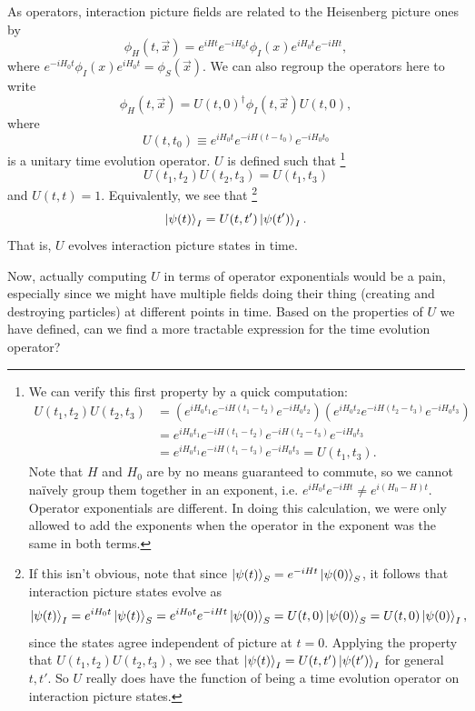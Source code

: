 As operators, interaction picture fields are related to the Heisenberg picture ones by
$$\phi_H(t,\vec x)=e^{iHt} e^{-iH_0t} \phi_I(x) e^{iH_0t} e^{-iHt},$$
where $e^{-iH_0t} \phi_I(x) e^{iH_0t}=\phi_S(\vec x).$ We can also regroup the operators here to write
$$\phi_H(t,\vec x) = U(t,0)^\dagger \phi_I(t,\vec x) U(t,0),$$
where 
\begin{equation}
    U(t,t_0)\equiv e^{iH_0t} e^{-iH(t-t_0)}e^{-iH_0t_0}%
\end{equation} is a unitary time evolution operator. $U$ is defined such that%
    \footnote{We can verify this first property by a quick computation:
    \begin{align*}
        U(t_1,t_2)U(t_2,t_3)&=\left(e^{iH_0 t_1}e^{-iH(t_1-t_2)}e^{-iH_0 t_2}\right)
        \left(e^{iH_0 t_2}e^{-iH(t_2-t_3)}e^{-iH_0 t_3}\right)\\
        &=e^{iH_0 t_1}e^{-iH(t_1-t_2)}e^{-iH(t_2-t_3)}e^{-iH_0 t_3}\\
        &=e^{iH_0 t_1}e^{-iH(t_1-t_3)}e^{-iH_0 t_3} = U(t_1,t_3).
    \end{align*}
    Note that $H$ and $H_0$ are by no means guaranteed to commute, so we cannot na\"ively group them together in an exponent, i.e. $e^{iH_0t}e^{-iHt}\neq e^{i(H_0-H)t}$. Operator exponentials are different. In doing this calculation, we were only allowed to add the exponents when the operator in the exponent was the same in both terms.}
%
$$U(t_1,t_2)U(t_2,t_3)=U(t_1,t_3)$$
%
and $U(t,t)=1$. Equivalently, we see that%
    \footnote{If this isn't obvious, note that since $\left| \psi(t) \right>_S=e^{-iHt}\left| \psi(0) \right>_S$, it follows that interaction picture states evolve as
    \begin{equation*}
        \left| \psi(t) \right>_I=e^{iH_0t}\left| \psi(t) \right>_S=e^{iH_0t}e^{-iHt}\left| \psi(0) \right>_S=U(t,0)\left| \psi(0) \right>_S=U(t,0)\left| \psi(0) \right>_I,
    \end{equation*}
    since the states agree independent of picture at $t=0$. Applying the property that $U(t_1,t_2)U(t_2,t_3)$, we see that $\left| \psi(t) \right>_I=U(t,t')\left| \psi(t') \right>_I$ for general $t,t'$. So $U$ really does have the function of being a time evolution operator on interaction picture states. }
%
$$\left| \psi(t) \right>_I=U(t,t')\left| \psi(t') \right>_I.$$ 
%
That is, $U$ evolves interaction picture states in time.

Now, actually computing $U$ in terms of operator exponentials would be a pain, especially since we might have multiple fields doing their thing (creating and destroying particles) at different points in time. Based on the properties of $U$ we have defined, can we find a more tractable expression for the time evolution operator? 

